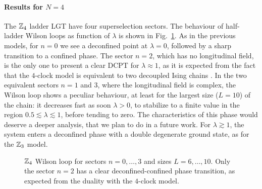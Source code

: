 \paragraph{Results for \texorpdfstring{$N=4$}{N=4}}%
The $\mathbb{Z}_4$ ladder LGT have four superselection sectors.
The behaviour of half-ladder Wilson loops as function of $\lambda$ is shown in Fig.~\ref{fig:z4_wilson}.
As in the previous models, for $n=0$ we see a deconfined point at $\lambda = 0$, followed by a sharp transition to a confined phase.
The sector $n=2$, which has no longitudinal field, is the only one to present a clear DCPT for $\lambda \approx 1$, as it is expected from the fact that the $4$-clock model is equivalent to two decoupled Ising chains \cite{ortiz2012dualities}.
In the two equivalent sectors $n=1$ and $3$, where the longitudinal field is complex, the Wilson loop shows a peculiar behaviour, at least for the largest size ($L=10$) of the chain: it decreases fast as soon $\lambda > 0$, to stabilize to a finite value in the region $0.5 \lesssim \lambda \lesssim 1$, before tending to zero.
The characteristics of this phase would deserve a deeper analysis, that we plan to do in a future work.
For $\lambda \gtrsim 1$, the system enters a deconfined phase with a double degenerate ground state, as for the $\mathbb{Z}_3$ model.


\begin{figure}[t]
    \centering
    
    \vspace*{-10pt}
    \caption{$\mathbb{Z}_4$ Wilson loop for sectors $n=0, \dots, 3$ and sizes $L=6, \dots, 10$.
        Only the sector $n = 2$ has a clear deconfined-confined phase transition, as expected from the duality with the $4$-clock model.
    }
    \label{fig:z4_wilson}
\end{figure}

\smallskip

%

